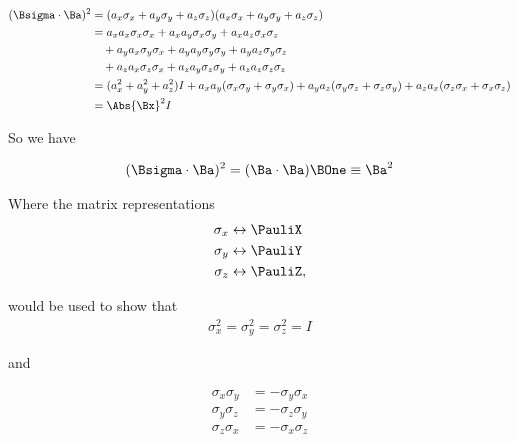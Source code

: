 \begin{align*}
(\Bsigma \cdot \Ba)^2
&=
(a_x \sigma_x
+ a_y \sigma_y
+ a_z \sigma_z)
(a_x \sigma_x
+ a_y \sigma_y
+ a_z \sigma_z) \\
&=
a_x a_x \sigma_x \sigma_x
+a_x a_y \sigma_x \sigma_y
+a_x a_z \sigma_x \sigma_z \\
&\quad+a_y a_x \sigma_y \sigma_x
+a_y a_y \sigma_y \sigma_y
+a_y a_z \sigma_y \sigma_z \\
&\quad+a_z a_x \sigma_z \sigma_x
+a_z a_y \sigma_z \sigma_y
+a_z a_z \sigma_z \sigma_z \\
&= (a_x^2 + a_y^2 + a_z^2) I
+ a_x a_y ( \sigma_x \sigma_y + \sigma_y \sigma_x)
+ a_y a_z ( \sigma_y \sigma_z + \sigma_z \sigma_y)
+ a_z a_x ( \sigma_z \sigma_x + \sigma_x \sigma_z) \\
&= \Abs{\Bx}^2 I
\end{align*}

So we have

\begin{align}\label{eqn:PHY356HNov2:135}
(\Bsigma \cdot \Ba)^2 = (\Ba \cdot \Ba) \BOne \equiv \Ba^2
\end{align}

Where the matrix representations
\begin{align}\label{eqn:PHY356HNov2:140}
\sigma_x &\leftrightarrow \PauliX \\
\sigma_y &\leftrightarrow \PauliY \\
\sigma_z &\leftrightarrow \PauliZ,
\end{align}

would be used to show that
\begin{align}\label{eqn:PHY356HNov2:150}
\sigma_x^2 = \sigma_y^2 = \sigma_z^2 = I
\end{align}

and

\begin{align}\label{eqn:PHY356HNov2:155}
\sigma_x \sigma_y &= -\sigma_y \sigma_x \\
\sigma_y \sigma_z &= -\sigma_z \sigma_y \\
\sigma_z \sigma_x &= -\sigma_x \sigma_z
\end{align}

